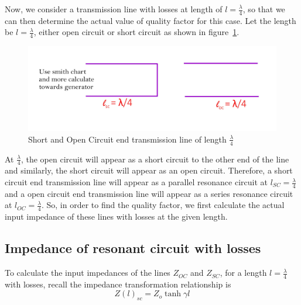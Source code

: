 Now, we consider a transmission line with losses at length of $ l=\frac{\lambda}{4} $, so that we can then determine the actual value of quality factor for this case. Let the length be $ l=\frac{\lambda}{4} $, either open circuit or short circuit as shown in figure~\ref{fig:fig1}.
\begin{figure}[h]
\centering
\includegraphics[width=1\linewidth]{./graphics/fig1}
\caption{Short and Open Circuit end transmission line of length $\frac{\lambda}{4}$}
\label{fig:fig1}
\end{figure}

At $ \frac{\lambda}{4} $, the open circuit will appear as a short circuit to the other end of the line and similarly, the short circuit will appear as an open circuit. Therefore, a short circuit end transmission line will appear as a parallel resonance circuit at $ l_{SC}=\frac{\lambda}{4} $ and a open circuit end transmission line will appear as a series resonance circuit at $ l_{OC}=\frac{\lambda}{4} $. So, in order to find the quality factor, we first calculate the actual input impedance of these lines with losses at the given length.

\subsection{Impedance of resonant circuit with losses}
To calculate the input impedances of the lines $ Z_{OC} $ and $ Z_{SC} $, for a length $ l=\frac{\lambda}{4} $ with losses, recall the impedance transformation relationship is
\begin{equation}
\boxed{Z(l)_{sc}=Z_{o}\tanh\gamma l}	\end{equation}

